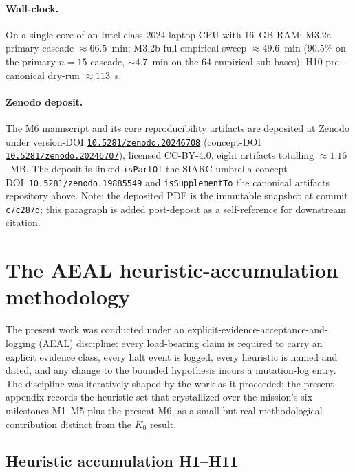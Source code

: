 \documentclass[11pt,a4paper]{article}
\newcommand{\K}{K_{0}}
\begin{document}
\paragraph{Wall-clock.}
On a single core of an Intel-class 2024 laptop CPU with $16$~GB RAM:
M3.2a primary cascade $\approx 66.5$~min; M3.2b full empirical sweep
$\approx 49.6$~min ($90.5\%$ on the primary $n{=}15$ cascade,
$\sim 4.7$~min on the $64$ empirical sub-bases);
H10 pre-canonical dry-run $\approx 113$~s.

\paragraph{Zenodo deposit.}
The M6 manuscript and its core reproducibility artifacts are deposited at
Zenodo under version-DOI
\href{https://doi.org/10.5281/zenodo.20246708}{\texttt{10.5281/zenodo.20246708}}
(concept-DOI
\href{https://doi.org/10.5281/zenodo.20246707}{\texttt{10.5281/zenodo.20246707}}),
licensed CC-BY-4.0, eight artifacts totalling $\approx 1.16$~MB.
The deposit is linked \texttt{isPartOf} the SIARC umbrella concept
DOI~\texttt{10.5281/zenodo.19885549} and \texttt{isSupplementTo} the
canonical artifacts repository above. Note: the deposited PDF is the
immutable snapshot at commit \texttt{c7c287d}; this paragraph is added
post-deposit as a self-reference for downstream citation.

\section{The AEAL heuristic-accumulation methodology}\label{app:aeal}

The present work was conducted under an explicit-evidence-acceptance-and-logging
(AEAL) discipline: every load-bearing claim is required to carry an
explicit evidence class, every halt event is logged, every heuristic is
named and dated, and any change to the bounded hypothesis incurs a
mutation-log entry.
The discipline was iteratively shaped by the work as it proceeded; the
present appendix records the heuristic set that crystallized over the
mission's six milestones M1--M5 plus the present M6, as a small but real
methodological contribution distinct from the $\K$ result.

\subsection{Heuristic accumulation H1--H11}\label{sec:aeal-heuristics}
\end{document}
